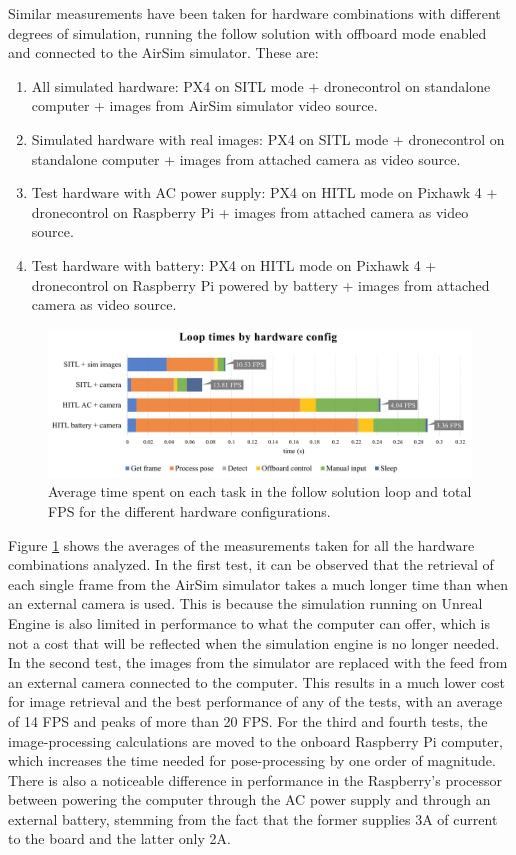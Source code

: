 Similar measurements have been taken for hardware combinations with different degrees of simulation, running the follow solution with offboard mode enabled and connected to the AirSim simulator.
These are:
\begin{enumerate}
    \item All simulated hardware: PX4 on SITL mode + dronecontrol on standalone computer + images from AirSim simulator video source.
    \item Simulated hardware with real images: PX4 on SITL mode + dronecontrol on standalone computer + images from attached camera as video source.
    \item Test hardware with AC power supply: PX4 on HITL mode on Pixhawk 4 + dronecontrol on Raspberry Pi + images from attached camera as video source.
    \item Test hardware with battery: PX4 on HITL mode on Pixhawk 4 + dronecontrol on Raspberry Pi powered by battery + images from attached camera as video source.
\end{enumerate}


\begin{figure}
  \centering
  \includegraphics[width=.9\textwidth, keepaspectratio]{img/performance-graph.png}
  \caption{Average time spent on each task in the follow solution loop and total FPS for the different hardware configurations.}
  \label{fig:perf-analysis}
\end{figure}


Figure \ref{fig:perf-analysis} shows the averages of the measurements taken for all the hardware combinations analyzed.
In the first test, it can be observed that the retrieval of each single frame from the AirSim simulator takes a much longer time than when an external camera is used.
This is because the simulation running on Unreal Engine is also limited in performance to what the computer can offer, which is not a cost that will be reflected when the simulation engine is no longer needed.
In the second test, the images from the simulator are replaced with the feed from an external camera connected to the computer. 
This results in a much lower cost for image retrieval and the best performance of any of the tests, with an average of 14 FPS and peaks of more than 20 FPS.
For the third and fourth tests, the image-processing calculations are moved to the onboard Raspberry Pi computer, which increases the time needed for pose-processing by one order of magnitude.
There is also a noticeable difference in performance in the Raspberry's processor between powering the computer through the AC power supply and through an external battery, stemming from the fact that the former supplies 3A of current to the board and the latter only 2A.


